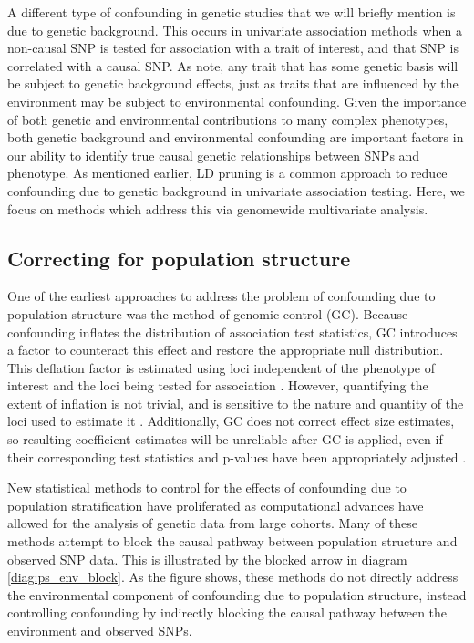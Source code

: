 A different type of confounding in genetic studies that we will briefly mention is due to genetic background. This occurs in univariate association methods when a non-causal SNP is tested for association with a trait of interest, and that SNP is correlated with a causal SNP. As \citet{vilhjalmsson2012nature} note, any trait that has some genetic basis will be subject to genetic background effects, just as traits that are influenced by the environment may be subject to environmental confounding. Given the importance of both genetic and environmental contributions to many complex phenotypes, both genetic background and environmental confounding are important factors in our ability to identify true causal genetic relationships between SNPs and phenotype. As mentioned earlier, LD pruning is a common approach to reduce confounding due to genetic background in univariate association testing. Here, we focus on methods which address this via genomewide multivariate analysis.

\subsection{Correcting for population structure}
\label{Sec:correcting-structure}

One of the earliest approaches to address the problem of confounding due to population structure was the method of genomic control (GC). Because confounding inflates the distribution of association test statistics, GC introduces a factor to counteract this effect and restore the appropriate null distribution. This deflation factor is estimated using loci independent of the phenotype of interest and the loci being tested for association \citep{devlin1999genomic, bacanu2000power, wang2009testing}. However, quantifying the extent of inflation is not trivial, and is sensitive to the nature and quantity of the loci used to estimate it \citep{hellwege2017population, marchini2004effects}. Additionally, GC does not correct effect size estimates, so resulting coefficient estimates will be unreliable after GC is applied, even if their corresponding test statistics and p-values have been appropriately adjusted \citep{hellwege2017population}.

New statistical methods to control for the effects of confounding due to population stratification have proliferated as computational advances have allowed for the analysis of genetic data from large cohorts. Many of these methods attempt to block the causal pathway between population structure and observed SNP data. This is illustrated by the blocked arrow in diagram \eqref{diag:ps_env_block}. As the figure shows, these methods do not directly address the environmental component of confounding due to population structure, instead controlling confounding by indirectly blocking the causal pathway between the environment and observed SNPs. 


